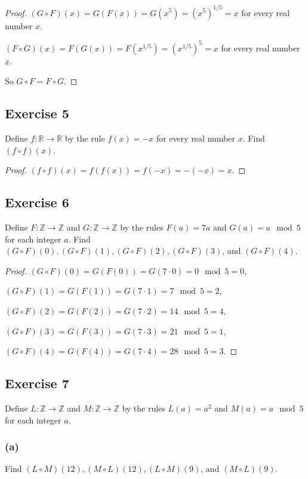\documentclass[14pt]{extarticle}
\newcommand{\R}{\mathbb{R}}
\newcommand{\Z}{\mathbb{Z}}
\begin{document}
\begin{proof}
\((G \circ F)(x) = G(F(x)) = G(x^5) = (x^5)^{1/5} = x\) for every real number $x$.

\((F \circ G)(x) = F(G(x)) = F(x^{1/5}) = (x^{1/5})^5 = x\) for every real number $x$.

So \(G \circ F = F \circ G\).
\end{proof}

\subsection{Exercise 5}
Define \(f: \R \to \R\) by the rule \(f(x) = -x\) for every real number $x$. Find \((f \circ f)(x)\).

\begin{proof}
\((f \circ f)(x) = f(f(x)) = f(-x) = -(-x) = x\).
\end{proof}

\subsection{Exercise 6}
Define \(F: \Z \to \Z\) and \(G: \Z \to \Z\) by the rules \(F(a) = 7a\) and \(G(a) = a \mod 5\) for each integer $a$. 
Find \((G \circ F)(0), (G \circ F)(1), (G \circ F)(2), (G \circ F)(3)\), and \((G \circ F)(4)\).

\begin{proof}
\((G \circ F)(0) = G(F(0)) = G(7 \cdot 0) = 0 \mod 5 = 0\),

\((G \circ F)(1) = G(F(1)) = G(7 \cdot 1) = 7 \mod 5 = 2\),

\((G \circ F)(2) = G(F(2)) = G(7 \cdot 2) = 14 \mod 5 = 4\),

\((G \circ F)(3) = G(F(3)) = G(7 \cdot 3) = 21 \mod 5 = 1\),

\((G \circ F)(4) = G(F(4)) = G(7 \cdot 4) = 28 \mod 5 = 3\).
\end{proof}

\subsection{Exercise 7}
Define \(L: \Z \to \Z\) and \(M: \Z \to \Z\) by the rules \(L(a) = a^2\) and \(M(a) = a \mod 5\) for each integer $a$.

\subsubsection{(a)}
Find \((L \circ M)(12), (M \circ L)(12), (L \circ M)(9)\), and \((M \circ L)(9)\).
\end{document}
